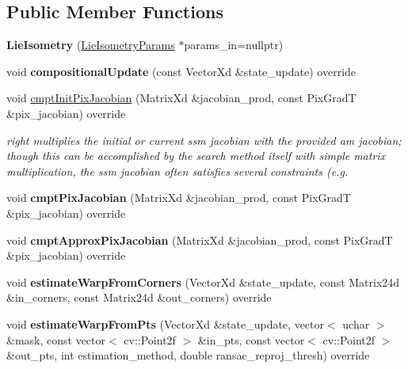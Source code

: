 \subsection*{Public Member Functions}
\begin{DoxyCompactItemize}
\item 
\hypertarget{classLieIsometry_aa2e46a58eace8f308c6da25e171cdce7}{{\bfseries Lie\-Isometry} (\hyperlink{structLieIsometryParams}{Lie\-Isometry\-Params} $\ast$params\-\_\-in=nullptr)}\label{classLieIsometry_aa2e46a58eace8f308c6da25e171cdce7}

\item 
\hypertarget{classLieIsometry_a874b75d855abb5faafea8cb047fa1afc}{void {\bfseries compositional\-Update} (const Vector\-Xd \&state\-\_\-update) override}\label{classLieIsometry_a874b75d855abb5faafea8cb047fa1afc}

\item 
void \hyperlink{classLieIsometry_a3959b6cf83ac76224c58902f8a4c41aa}{cmpt\-Init\-Pix\-Jacobian} (Matrix\-Xd \&jacobian\-\_\-prod, const Pix\-Grad\-T \&pix\-\_\-jacobian) override
\begin{DoxyCompactList}\small\item\em right multiplies the initial or current ssm jacobian with the provided am jacobian; though this can be accomplished by the search method itself with simple matrix multiplication, the ssm jacobian often satisfies several constraints (e.\-g. \end{DoxyCompactList}\item 
\hypertarget{classLieIsometry_ab1c923badf7a3f4167e7b6f0b0618363}{void {\bfseries cmpt\-Pix\-Jacobian} (Matrix\-Xd \&jacobian\-\_\-prod, const Pix\-Grad\-T \&pix\-\_\-jacobian) override}\label{classLieIsometry_ab1c923badf7a3f4167e7b6f0b0618363}

\item 
\hypertarget{classLieIsometry_a471e92fde166f9800f8c7d20810c9b22}{void {\bfseries cmpt\-Approx\-Pix\-Jacobian} (Matrix\-Xd \&jacobian\-\_\-prod, const Pix\-Grad\-T \&pix\-\_\-jacobian) override}\label{classLieIsometry_a471e92fde166f9800f8c7d20810c9b22}

\item 
\hypertarget{classLieIsometry_aaac27c4e564695011a9dcc1aa28ece8f}{void {\bfseries estimate\-Warp\-From\-Corners} (Vector\-Xd \&state\-\_\-update, const Matrix24d \&in\-\_\-corners, const Matrix24d \&out\-\_\-corners) override}\label{classLieIsometry_aaac27c4e564695011a9dcc1aa28ece8f}

\item 
\hypertarget{classLieIsometry_a69ddb625320d81e80fa8e445d1596540}{void {\bfseries estimate\-Warp\-From\-Pts} (Vector\-Xd \&state\-\_\-update, vector$<$ uchar $>$ \&mask, const vector$<$ cv\-::\-Point2f $>$ \&in\-\_\-pts, const vector$<$ cv\-::\-Point2f $>$ \&out\-\_\-pts, int estimation\-\_\-method, double ransac\-\_\-reproj\-\_\-thresh) override}\label{classLieIsometry_a69ddb625320d81e80fa8e445d1596540}


\end{DoxyCompactItemize}
